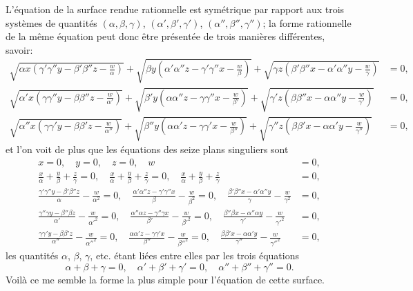 \documentclass[11pt,a4paper]{article}
\begin{document}
L'\'{e}quation de la surface rendue rationnelle est sym\'{e}trique par rapport aux trois syst\`{e}mes de quantit\'{e}s $(\alpha, \beta, \gamma)$, $(\alpha', \beta', \gamma')$, $(\alpha'', \beta'', \gamma'')$; la forme rationnelle de la m\^{e}me \'{e}quation peut donc \^{e}tre pr\'{e}sent\'{e}e de trois mani\`{e}res diff\'{e}rentes, savoir:
\begin{align*}
\sqrt{\alpha x (\gamma'\gamma'' y - \beta'\beta'' z - \tfrac{w}{\alpha})} + \sqrt{\beta y (\alpha'\alpha'' z - \gamma'\gamma'' x - \tfrac{w}{\beta})} + \sqrt{\gamma z (\beta'\beta'' x - \alpha'\alpha'' y - \tfrac{w}{\gamma})} &= 0, \\
\sqrt{\alpha' x (\gamma\gamma'' y - \beta\beta'' z - \tfrac{w}{\alpha'})} + \sqrt{\beta' y (\alpha\alpha'' z - \gamma\gamma'' x - \tfrac{w}{\beta'})} + \sqrt{\gamma' z (\beta\beta'' x - \alpha\alpha'' y - \tfrac{w}{\gamma'})} &= 0, \\
\sqrt{\alpha'' x (\gamma\gamma' y - \beta\beta' z - \tfrac{w}{\alpha''})} + \sqrt{\beta'' y (\alpha\alpha' z - \gamma\gamma' x - \tfrac{w}{\beta''})} + \sqrt{\gamma'' z (\beta\beta' x - \alpha\alpha' y - \tfrac{w}{\gamma''})} &= 0,
\end{align*}
et l'on voit de plus que les \'{e}quations des seize plans singuliers sont
\begin{align*}
x = 0,\quad y = 0,\quad z = 0,\quad w &= 0, \\
\frac{x}{\alpha} + \frac{y}{\beta} + \frac{z}{\gamma} = 0,\quad
\frac{x}{\alpha} + \frac{y}{\beta} + \frac{z}{\gamma} = 0,\quad
\frac{x}{\alpha} + \frac{y}{\beta} + \frac{z}{\gamma} &= 0, \\
\frac{\gamma'\gamma'' y - \beta'\beta'' z}{\alpha} - \frac{w}{\alpha^2} = 0,\quad
\frac{\alpha'\alpha'' z - \gamma'\gamma'' x}{\beta} - \frac{w}{\beta^2} = 0,\quad
\frac{\beta'\beta'' x - \alpha'\alpha'' y}{\gamma} - \frac{w}{\gamma^2} &= 0, \\
\frac{\gamma''\gamma y - \beta''\beta z}{\alpha'} - \frac{w}{\alpha'^2} = 0,\quad
\frac{\alpha''\alpha z - \gamma''\gamma x}{\beta'} - \frac{w}{\beta'^2} = 0,\quad
\frac{\beta''\beta x - \alpha''\alpha y}{\gamma'} - \frac{w}{\gamma'^2} &= 0, \\
\frac{\gamma\gamma' y - \beta\beta' z}{\alpha''} - \frac{w}{\alpha''^2} = 0,\quad
\frac{\alpha\alpha' z - \gamma\gamma' x}{\beta''} - \frac{w}{\beta''^2} = 0,\quad
\frac{\beta\beta' x - \alpha\alpha' y}{\gamma''} - \frac{w}{\gamma''^2} &= 0,
\end{align*}
les quantit\'{e}s $\alpha$, $\beta$, $\gamma$, etc. \'{e}tant li\'{e}es entre elles par les trois \'{e}quations
\[
\alpha + \beta + \gamma = 0,\quad \alpha' + \beta' + \gamma' = 0,\quad \alpha'' + \beta'' + \gamma'' = 0.
\]
Voil\`{a} ce me semble la forme la plus simple pour l'\'{e}quation de cette surface.
\end{document}
